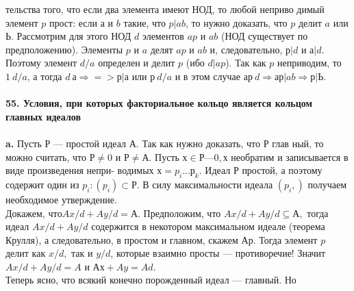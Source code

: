 тельства того, что если два элемента имеют НОД, то любой неприво­\linebreak
димый элемент $p$ прост: если $а$ и $b$ такие, что $p | ab$, то нужно доказать,\linebreak
что $p$ делит $a$ или $Ь$. Рассмотрим для этого НОД $d$ элементов $ap$ и $ab$\linebreak
(НОД существует по предположению). Элементы $p$ и $a$ делят $ap$ и $ab$ и, \linebreak
следовательно, $р | d$ и $а | d$. Поэтому элемент $d/a$ определен и делит $p$\linebreak
(ибо $d | ap$). Так как $p$ неприводим, то $1 ~ d/a$, а тогда $d ~ а \Rightarrow=> р | а$\linebreak
или $р ~ d/a$ и в этом случае $ар ~ d \Rightarrow ар | ab \Rightarrow р | Ь.$\\
\\
\noindent\textbf{55. Условия, при которых факториальное кольцо является\linebreak
кольцом главных идеалов}\\
\\
\hspace*{15pt}\textbf{a.} Пусть $Р$ --- простой идеал $А$. Так как нужно доказать, что $Р$ глав­\linebreak
ный, то можно считать, что $Р \neq {0}$ и $Р \neq А$. Пусть\linebreak
$х \in Р — {0}, х$ необратим и записывается в виде произведения непри-\linebreak
водимых $х = p_i\ldots р_k$. Идеал $Р$ простой, а поэтому содержит один из \linebreak
$p_{i}: (p_i) \subset Р .$ В силу максимальности идеала $(p_i,)$ получаем необходимое\linebreak
утверждение.\\
\hspace*{0pt} Докажем, $что Ax/d + Ay/d = А.$ Предположим, что $Ax/d + A y/d \subseteq А,$\linebreak
тогда идеал $Ax/d + Ay/d$ содержится в некотором максимальном идеале\linebreak
(теорема Крулля), а следовательно, в простом и главном, скажем $Ар.$\linebreak
Тогда элемент $p$ делит как $x/d,$ так и $y/d$, которые взаимно просты ---\linebreak
противоречие! Значит $Ax/d + Ay/d = A$ и $Ах + Ay = Ad$.\\
\hspace*{0pt} Теперь ясно, что всякий конечно порожденный идеал --- главный. Но\linebreak
